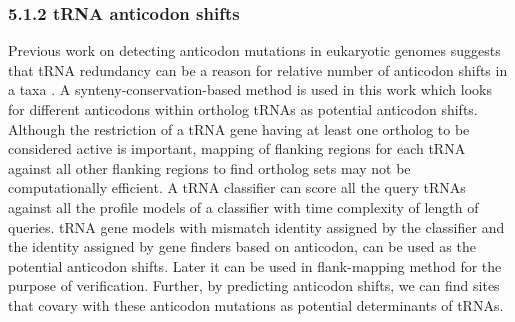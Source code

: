\documentclass[
12pt, %
a4paper, %
oneside, %
headinclude,footinclude, %
BCOR5mm, %
]{scrartcl}
\begin{document}
\subsubsection*{5.1.2 tRNA anticodon shifts}
Previous work on detecting anticodon mutations in eukaryotic genomes suggests that tRNA redundancy can be a reason for relative number of anticodon shifts in a taxa \cite{Rogers2014tRNAAS}. A synteny-conservation-based method is used in this work which looks for different anticodons within ortholog tRNAs as potential anticodon shifts. Although the restriction of a tRNA gene having at least one ortholog to be considered active is important, mapping of flanking regions for each tRNA against all other flanking regions to find ortholog sets may not be computationally efficient. A tRNA classifier can score all the query tRNAs against all the profile models of a classifier with time complexity of length of queries. tRNA gene models with mismatch identity assigned by the classifier and the identity assigned by gene finders based on anticodon, can be used as the potential anticodon shifts. Later it can be used in flank-mapping method for the purpose of verification. Further, by predicting anticodon shifts, we can find sites that covary with these anticodon mutations as potential determinants of tRNAs.


\newpage
\renewcommand{\refname}{\spacedlowsmallcaps{References}} %




\end{document}
